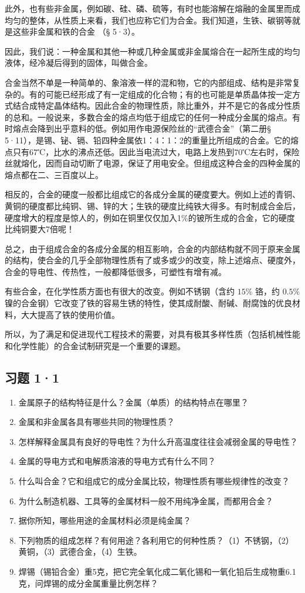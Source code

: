 此外，也有些非金属，例如碳、硅、磷、硫等，有时也能溶解在熔融的金属里而成均匀的整体，从性质上来看，我们也应称它们为合金。我们知道，生铁、碳钢等就是这些非金属和铁的合金
（§ 5·3）。

因此，我们说：一种金属和其他一种或几种金属或非金属熔合在一起所生成的均匀液体，经冷凝后得到的固体，叫做合金。

合金当然不单是一种简单的、象溶液一样的混和物，它的内部组成、结构是非常复杂的。有的可能已经形成了有一定组成的化合物；有的也可能是单质晶体按一定方式结合成特定晶体结构。因此合金的物理性质，除比重外，并不是它的各成分性质的总和。一般说来，多数合金的熔点均低于组成它的任何一种成分金属的熔点。有时熔点会降到出乎意料的低。例如用作电源保险丝的``武德合金''（第二册§
5·11），是锡、铋、镉、铅四种金属依1：4：1：2的重量比所组成的合金。它的熔点只有67℃，比水的沸点还低。因此当电流过大，电路上发热到70℃左右时，保险丝就熔化，因而自动切断了电源，保证了用电安全。但组成这种合金的四种金属的熔点都在二、三百度以上。

相反的，合金的硬度一般都比组成它的各成分金属的硬度要大。例如上述的青铜、黄铜的硬度都比纯铜、锡、锌的大；生铁的硬度比纯铁大得多。有时制成合金后，硬度增大的程度是惊人的，例如在铜里仅仅加入1\%的铍所生成的合金，它的硬度比纯铜要大7倍呢！

总之，由于组成合金的各成分金属的相互影响，合金的内部结构就不同于原来金属的结构，使合金的几乎全部物理性质有了或多或少的改变，除上述熔点、硬度外，合金的导电性、传热性，一般都降低很多，可塑性有增有减。

有些合金，在化学性质方面也有很大的改变。例如不锈钢（含约 \(15\%\) 铬，约
\(0.5\%\)
镍的合金钢）它改变了铁的容易生锈的特性，使其成耐酸、耐碱、耐腐蚀的优良材料，大大提高了铁的使用价值。

所以，为了满足和促进现代工程技术的需要，对具有极其多样性质（包括机械性能和化学性能）的合金试制研究是一个重要的课题。

\subsection{习题 1·1}

\begin{enumerate}
\item
  金属原子的结构特征是什么？金属（单质）的结构特点在哪里？
\item
  金属和非金属各具有哪些共同的物理性质？
\item
  怎样解释金属具有良好的导电性？为什么升高温度往往会减弱金属的导电性？
\item
  金属的导电方式和电解质溶液的导电方式有什么不同？
\item
  什么叫合金？它和组成它的成分金属比较，物理性质有哪些规律性的改变？
\item
  为什么制造机器、工具等的金属材料一般不用纯净金属，而都用合金？
\item
  据你所知，哪些用途的金属材料必须是纯金属？
\item
  下列物质的组成怎样？有何用途？各利用它的何种性质？（1）不锈钢，（2）黄铜，（3）武德合金，（4）生铁。
\item
  焊锡（锡铅合金）重5克，把它完全氧化成二氧化锡和一氧化铅后生成物重6.1克，问焊锡的成分金属重量比例怎样？
\end{enumerate}

